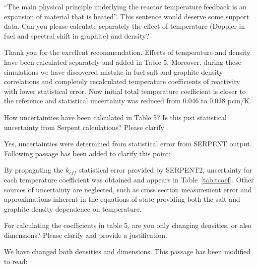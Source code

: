 \documentclass[answers,11pt]{exam}
\begin{document}
\begin{questions}
        \question ``The main physical principle underlying the reactor 
        temperature feedback is an expansion of material that is heated''. This 
        sentence would deserve some support data. Can you please calculate 
        separately the effect of temperature (Doppler in fuel and spectral 
        shift in graphite) and density?
        \begin{solution}
                Thank you for the excellent recommendation. Effects of temperature
                 and density have been calculated separately and added in Table 5.
                 Moreover, during these simulations we have discovered mistake in 
                 fuel salt and graphite density correlations and completely 
                 recalculated temperature coefficients of reactivity with lower 
                 statistical error. Now initial total temperature coefficient is 
                 closer to the reference and statistical uncertainty was reduced 
                 from 0.046 to 0.038 pcm/K.
        \end{solution}


        \question How uncertainties have been calculated in Table 5? Is this 
        just statistical uncertainty from Serpent calculations? Please clarify
        \begin{solution}
                Yes, uncertainties were determined from statistical error 
                from SERPENT output. Following passage has been added to clarify
                 this point:
                 
                 By propagating the $k_{eff}$  statistical error provided by 
                 SERPENT2, uncertainty for each temperature coefficient was 
                 obtained and appears in Table~\ref{tab:tcoef}. Other sources 
                 of uncertainty are neglected, such as cross section 
                 measurement error and approximations inherent in the equations 
                 of state providing both the salt and graphite density 
                 dependence on temperature.  
        \end{solution}


        \question For calculating the coefficients in table 5, are you only 
        changing densities, or also dimensions? Please clarify and provide a 
        justification.  
        \begin{solution}
        		We have changed both densities and dimensions. This passage 
        		has been modified to read:


\end{solution}
\end{questions}
\end{document}
